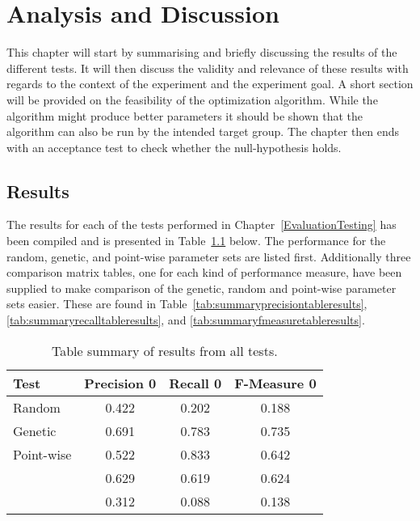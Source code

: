 \chapter{Analysis and Discussion} %

\label{AnalysisAndDiscussion}

This chapter will start by summarising and briefly discussing the results of the different tests. It will then discuss the validity and relevance of these results with regards to the context of the experiment and the experiment goal. A short section will be provided on the feasibility of the optimization algorithm. While the algorithm might produce better parameters it should be shown that the algorithm can also be run by the intended target group. The chapter then ends with an acceptance test to check whether the null-hypothesis holds.

\section{Results}
\label{Results}
The results for each of the tests performed in Chapter~\ref{EvaluationTesting} has been compiled and is presented in Table~\ref{tab:summarytableresults} below. The performance for the random, genetic, and point-wise parameter sets are listed first. Additionally three comparison matrix tables, one for each kind of performance measure, have been supplied to make comparison of the genetic, random and point-wise parameter sets easier. These are found in Table~\ref{tab:summaryprecisiontableresults}, \ref{tab:summaryrecalltableresults}, and \ref{tab:summaryfmeasuretableresults}.

\begin{table}[H]
\begin{center}
\begin{tabular}{|l|ccc|}
\hline
Test & Precision 0 & Recall 0 & F-Measure 0\\ 
\hline
Random 						&   0.422& 	  0.202& 	0.188\\ 
Genetic 					&   0.691&    0.783&    0.735\\ 
Point-wise 					&   0.522&    0.833&    0.642\\ 
\citeauthor{Moe2014compact} &   0.629&    0.619&    0.624\\ 
\citeauthor{Oren1998}		&   0.312&    0.088&    0.138\\ 
\hline
\end{tabular}
\end{center}
\caption{Table summary of results from all tests.}
\label{tab:summarytableresults}
\end{table}


